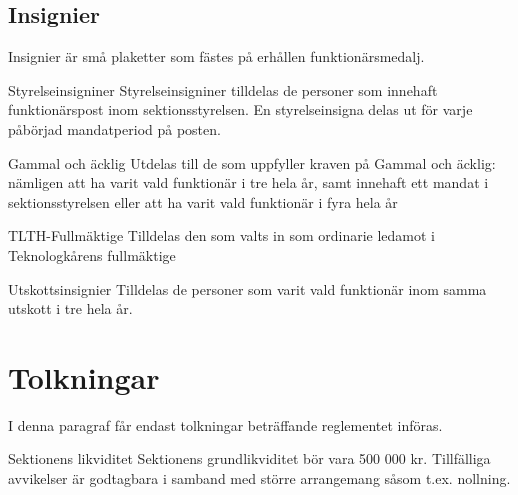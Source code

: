 \documentclass[pdfbookmarks,a4paper,11pt]{article}
\newlength{\itemcollength}
\newenvironment{reglemlista}{%
  \begin{list}{}{%
      \setlength{\labelwidth}{\itemcollength}%
      \setlength{\leftmargin}{\labelwidth + \labelsep}%
      \renewcommand{\makelabel}[1]{%
        \raisebox{0pt}[1ex][0pt]{%
          \makebox[\labelwidth][l]{%
            \parbox[t]{\itemcollength}{%
              \raggedright\hspace{0pt}##1}}}\hfill}%
      }}{%
  \end{list}}
\begin{document}
\subsection{Insignier}
Insignier är små plaketter som fästes på erhållen funktionärsmedalj.

\begin{reglemlista}
	\item[Styrelseinsigniner]
	Styrelseinsigniner tilldelas de personer som innehaft funktionärspost inom sektionsstyrelsen. En styrelseinsigna delas ut för varje påbörjad mandatperiod på posten.
	\item[Gammal och äcklig]
	Utdelas till de som uppfyller kraven på Gammal och äcklig: nämligen att ha varit vald funktionär i tre hela år, samt innehaft ett mandat i sektionsstyrelsen eller att ha varit vald funktionär i fyra hela år
	\item[TLTH-Fullmäktige]
	Tilldelas den som valts in som ordinarie ledamot i Teknologkårens fullmäktige
	\item[Utskottsinsignier]
	Tilldelas de personer som varit vald funktionär inom samma utskott i tre hela år.  
\end{reglemlista}

\section{Tolkningar}

I denna paragraf får endast tolkningar beträffande reglementet införas.

\begin{reglemlista}

	\item[Sektionens likviditet]
	Sektionens grundlikviditet bör vara 500 000 kr. Tillfälliga avvikelser är godtagbara i samband med större arrangemang såsom t.ex. nollning.

\end{reglemlista}
\end{document}
